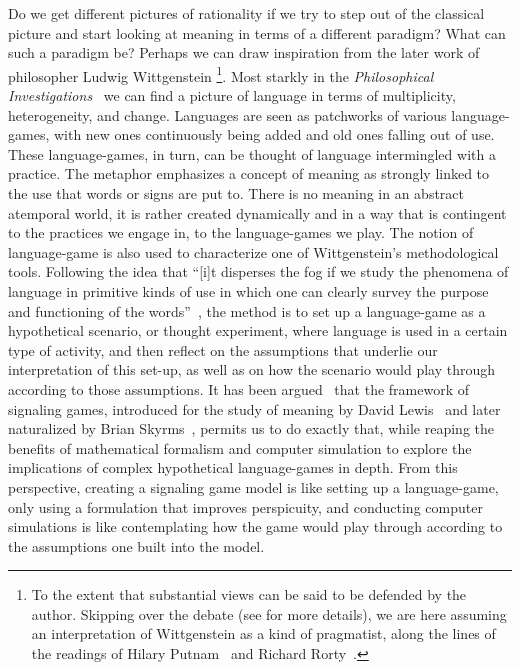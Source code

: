\documentclass[a4paper]{article}
\begin{document}
Do we get different pictures of rationality if we try to step out of the classical picture and start looking at meaning in terms of a different paradigm?
What can such a paradigm be?
Perhaps we can draw inspiration from the later work of philosopher Ludwig Wittgenstein%
\footnote{To the extent that substantial views can be said to be defended by the author. Skipping over the debate (see \cite{kahane_wittgenstein_2007} for more details), we are here assuming an interpretation of Wittgenstein as a kind of pragmatist, along the lines of the readings of Hilary Putnam~\parencite*{putnam_pragmatism_1994} and Richard Rorty~\parencite*{rorty_wittgenstein_2007}.}.
Most starkly in the \emph{Philosophical Investigations}~\parencite*{wittgenstein_philosophical_1953} we can find a picture of language in terms of multiplicity, heterogeneity, and change.
Languages are seen as patchworks of various language-games, with new ones continuously being added and old ones falling out of use.
These language-games, in turn, can be thought of language intermingled with a practice.
The metaphor emphasizes a concept of meaning as strongly linked to the use that words or signs are put to.
There is no meaning in an abstract atemporal world, it is rather created dynamically and in a way that is contingent to the practices we engage in, to the language-games we play.
The notion of language-game is also used to characterize one of Wittgenstein's methodological tools.
Following the idea that ``[i]t disperses the fog if we study the phenomena of language in primitive kinds of use in which one can clearly survey the purpose and functioning of the words''~\parencite*[\S 5]{wittgenstein_philosophical_1953}, the method is to set up a language-game as a hypothetical scenario, or thought experiment, where language is used in a certain type of activity, and then reflect on the assumptions that underlie our interpretation of this set-up, as well as on how the scenario would play through according to those assumptions.
It has been argued~\parencite{correia_bivalent_2013} that the framework of signaling games, introduced for the study of meaning by David Lewis~\parencite*{lewis_convention_1969} and later naturalized by Brian Skyrms~\parencite*{skyrms_evolution_1996,skyrms_signals_2010}, permits us to do exactly that, while reaping the benefits of mathematical formalism and computer simulation to explore the implications of complex hypothetical language-games in depth.
From this perspective, creating a signaling game model is like setting up a language-game, only using a formulation that improves perspicuity, and conducting computer simulations is like contemplating how the game would play through according to the assumptions one built into the model.
\end{document}
